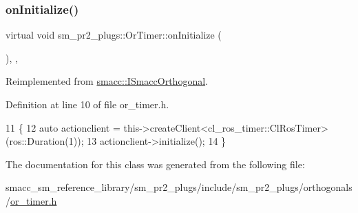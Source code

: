 \subsubsection{\texorpdfstring{on\+Initialize()}{onInitialize()}}
{\footnotesize\ttfamily virtual void sm\+\_\+pr2\+\_\+plugs\+::\+Or\+Timer\+::on\+Initialize (\begin{DoxyParamCaption}{ }\end{DoxyParamCaption})\hspace{0.3cm}{\ttfamily [inline]}, {\ttfamily [override]}, {\ttfamily [virtual]}}



Reimplemented from \hyperlink{classsmacc_1_1ISmaccOrthogonal_a6bb31c620cb64dd7b8417f8705c79c7a}{smacc\+::\+I\+Smacc\+Orthogonal}.



Definition at line 10 of file or\+\_\+timer.\+h.


\begin{DoxyCode}
11     \{
12         \textcolor{keyword}{auto} actionclient = this->createClient<cl\_ros\_timer::ClRosTimer>(ros::Duration(1));
13         actionclient->initialize();
14     \}
\end{DoxyCode}


The documentation for this class was generated from the following file\+:\begin{DoxyCompactItemize}
\item 
smacc\+\_\+sm\+\_\+reference\+\_\+library/sm\+\_\+pr2\+\_\+plugs/include/sm\+\_\+pr2\+\_\+plugs/orthogonals/\hyperlink{sm__pr2__plugs_2include_2sm__pr2__plugs_2orthogonals_2or__timer_8h}{or\+\_\+timer.\+h}\end{DoxyCompactItemize}
